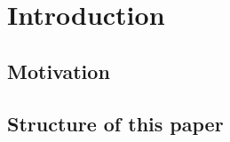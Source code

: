 \section{Introduction}\label{sec:Intro}


\subsection{Motivation}


\subsection{Structure of this paper}
